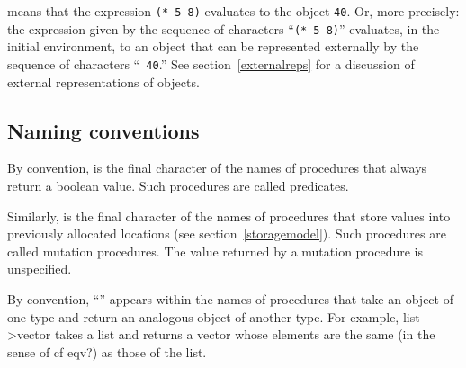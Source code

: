 means that the expression {\tt(* 5 8)} evaluates to the object {\tt 40}.
Or, more precisely:  the expression given by the sequence of characters
``{\tt(* 5 8)}'' evaluates, in the initial environment, to an object
that can be represented externally by the sequence of characters ``{\tt
40}.''  See section~\ref{externalreps} for a discussion of external
representations of objects.

\subsection{Naming conventions}

By convention,  is the final character of the names
of procedures that always return a boolean value.
Such procedures are called predicates.

Similarly, \ide{!} is the final character of the names
of procedures that store values into previously
allocated locations (see section~\ref{storagemodel}).
Such procedures are called mutation procedures.
The value returned by a mutation procedure is unspecified.

By convention, ``\ide{->}'' appears within the names of procedures that
take an object of one type and return an analogous object of another type.
For example, {\cf list->vector} takes a list and returns a vector whose
elements are the same (in the sense of {cf eqv?}) as those of the list.

	
